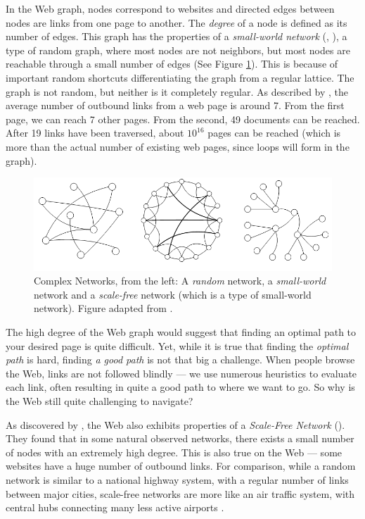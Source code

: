 In the Web graph, nodes correspond to websites and
directed edges between nodes are links from one page to another. The \emph{degree} of a node is defined as its number of edges.
This graph has the properties of a \emph{small-world network} (\citep{Newman2000}, \citep[p.2]{Huang2005}), 
a type of random graph, where most nodes are not neighbors, but most nodes are reachable through a small number of edges (See Figure \ref{fig:swn}). 
This is because of important random shortcuts differentiating the graph from a regular lattice. 
The graph is not  random, but neither is it completely regular.
As described by \citet[p.37]{Barabasi2003}, the average number of outbound links from a web page is around 7.
From the first page, we can reach 7 other pages. From the second, 49 documents can be reached. 
After 19 links have been traversed, about $10^{16}$ pages can be reached (which is more than the actual number of existing web pages, since loops will form in the graph).

\begin{figure}[t]
  \includegraphics[width=\textwidth]{../graphics/graphs}
  \caption[Examples of Complex Networks]{
    Complex Networks,
    from the left: A \emph{random} network, a \emph{small-world} network and a \emph{scale-free} network 
    (which is a type of  small-world network). Figure adapted from \citep[p.2]{Huang2005}.} 
  \label{fig:swn}
\end{figure}

The high degree of the Web graph would suggest that finding an optimal path to your desired page is quite difficult. 
Yet, while it is true that finding the \emph{optimal path} is hard, finding \emph{a good path} is not that big a challenge. 
When people browse the Web, links are not followed blindly --- 
we use numerous heuristics to evaluate each link, often resulting in quite a good path to where we want to go. 
So why is the Web still quite challenging to navigate?

As discovered by \cite{Albert1999}, the Web also exhibits properties of a \emph{Scale-Free Network} (). 
They found that in some natural observed networks, there exists a small number of nodes with an extremely high degree. 
This is also true on the Web --- some websites have a huge number of outbound links. 
For comparison, while a random network is similar to a national highway system, with a regular number of links between major cities, scale-free networks are more like an air traffic system, with central hubs connecting many less active airports \citep[p.71]{Barabasi2003}.

